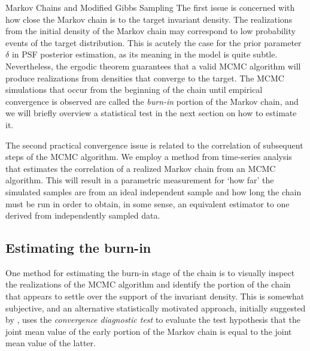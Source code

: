 \begin{chapter}{Markov Chains and Modified Gibbs Sampling}
The first issue is concerned with how close the Markov chain is to the target invariant density.
The realizations from the initial density of the Markov chain may correspond to low probability events of the target distribution.
This is acutely the case for the prior parameter $\delta$ in PSF posterior estimation, as its meaning in the model is quite subtle.
Nevertheless, the ergodic theorem guarantees that a valid MCMC algorithm will produce realizations from densities that converge to the target.
The MCMC simulations that occur from the beginning of the chain until empirical convergence is observed are called the \emph{burn-in} portion of the Markov chain, and we will briefly overview a statistical test in the next section on how to estimate it.

The second practical convergence issue is related to the correlation of subsequent steps of the MCMC algorithm.
We employ a method from time-series analysis that estimates the correlation of a realized Markov chain from an MCMC algorithm.
This will result in a parametric measurement for `how far' the simulated samples are from an ideal independent sample and how long the chain must be run in order to obtain, in some sense, an equivalent estimator to one derived from independently sampled data.

\subsection{Estimating the burn-in}

One method for estimating the burn-in stage of the chain is to visually inspect the realizations of the MCMC algorithm and identify the portion of the chain that appears to settle over the support of the invariant density.
This is somewhat subjective, and an alternative statistically motivated approach, initially suggested by \citep{geweke1991evaluating}, uses the \emph{convergence diagnostic test} to evaluate the test hypothesis that the joint mean value of the early portion of the Markov chain is equal to the joint mean value of the latter. 


\end{chapter}
